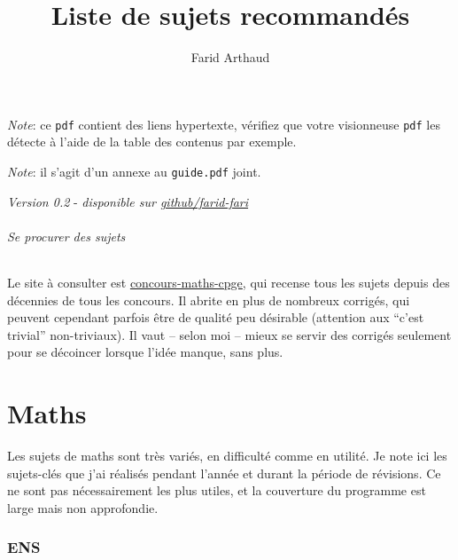 \documentclass{article}
\begin{document}
\title{Liste de sujets recommandés}
\author{Farid Arthaud}
\maketitle
\tableofcontents

\vspace{1cm}

\textit{Note}: ce \texttt{pdf} contient des liens hypertexte, vérifiez que votre visionneuse \texttt{pdf} les détecte à l'aide de la table des contenus par exemple.

\textit{Note}: il s'agit d'un annexe au \texttt{guide.pdf} joint.

\textit{Version 0.2} - \textit{disponible sur \href{https://github.com/farid-fari/guideprepa}{github/farid-fari}}

\paragraph{Se procurer des sujets}\mbox{}\newline
Le site à consulter est \href{https://concours-maths-cpge.fr}{concours-maths-cpge}, qui recense tous les sujets depuis des décennies de tous les concours.
Il abrite en plus de nombreux corrigés, qui peuvent cependant parfois être de qualité peu désirable (attention aux ``c'est trivial'' non-triviaux).
Il vaut -- selon moi -- mieux se servir des corrigés seulement pour se décoincer lorsque l'idée manque, sans plus.

\part{Maths}
Les sujets de maths sont très variés, en difficulté comme en utilité.
Je note ici les sujets-clés que j'ai réalisés pendant l'année et durant la période de révisions.
Ce ne sont pas nécessairement les plus utiles, et la couverture du programme est large mais non approfondie.

\section{ENS}
\end{document}
